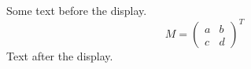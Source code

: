 \documentclass[12pt]{article}
\begin{document}
Some text before the display.
\[ M = \left( \begin{matrix} a & b \\ c & d \end{matrix} \right)^{T} \]
Text after the display.
\end{document}

